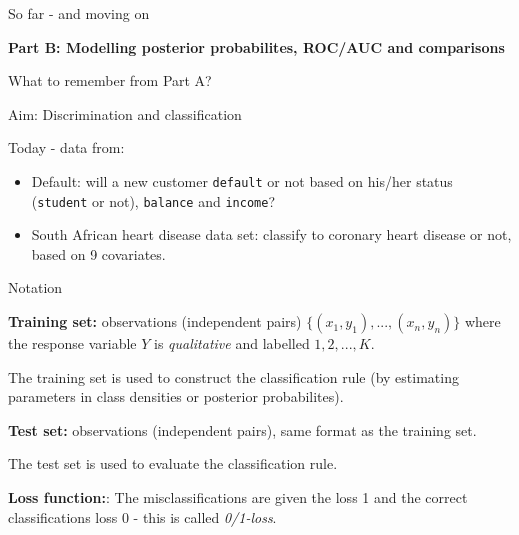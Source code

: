\documentclass[10pt,ignorenonframetext,]{beamer}
\providecommand{\tightlist}{%
  \setlength{\itemsep}{0pt}\setlength{\parskip}{0pt}}
\begin{document}
\begin{frame}[fragile]{So far - and moving on}

\large

\textbf{Part B: Modelling posterior probabilites, ROC/AUC and
comparisons}

\normalsize

\begin{block}{What to remember from Part A?}

\begin{block}{Aim: Discrimination and classification}

Today - data from:

\begin{itemize}
\tightlist
\item
  Default: will a new customer \texttt{default} or not based on his/her
  status (\texttt{student} or not), \texttt{balance} and
  \texttt{income}?
\item
  South African heart disease data set: classify to coronary heart
  disease or not, based on 9 covariates.
\end{itemize}

\end{block}

\end{block}

\end{frame}

\begin{frame}

\begin{block}{Notation}

\textbf{Training set:} observations (independent pairs)
\(\{(x_1, y_1), ..., (x_n, y_n)\}\) where the response variable \(Y\) is
\emph{qualitative} and labelled \(1, 2, ..., K\).

The training set is used to construct the classification rule (by
estimating parameters in class densities or posterior probabilites).

\textbf{Test set:} observations (independent pairs), same format as the
training set.

The test set is used to evaluate the classification rule.

\textbf{Loss function:}: The misclassifications are given the loss 1 and
the correct classifications loss 0 - this is called \emph{0/1-loss}.

\end{block}

\end{frame}
\end{document}
